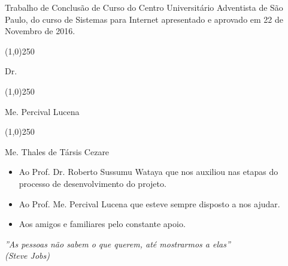 
\newpage
\vspace*{\fill}
\begin{center}
    {Trabalho de Conclusão de Curso do Centro Universitário Adventista de São Paulo, do curso
    de Sistemas para Internet apresentado e aprovado em 22 de Novembro de 2016.}
\end{center}
\vspace{8mm}
\begin{center}
    {\line(1,0){250}
	\par
	Dr. \imprimirorientador    
    }
\end{center}
\vspace{5mm}
\begin{center}
    {\line(1,0){250}
	\par
	Me. Percival Lucena    
    }
\end{center}
\vspace{5mm}
\begin{center}
    {\line(1,0){250}
	\par
	Me. Thales de Társis Cezare    
    }
\end{center}
\vspace*{\fill}
\newpage
\cleardoublepage

\begin{agradecimentos}
	\begin{itemize}
		\item Ao Prof. Dr. Roberto Sussumu Wataya  que nos auxiliou nas etapas do processo de desenvolvimento do projeto.
		\item Ao Prof. Me. Percival Lucena que esteve sempre disposto a nos ajudar.
		\item Aos amigos e familiares pelo constante apoio.
	\end{itemize}
\end{agradecimentos}

\begin{epigrafe}
    \vspace*{\fill}
	\begin{flushright}
		\textit{''As pessoas não sabem o que querem, até mostrarmos a elas''\\
		(Steve Jobs)}
	\end{flushright}
\end{epigrafe}


